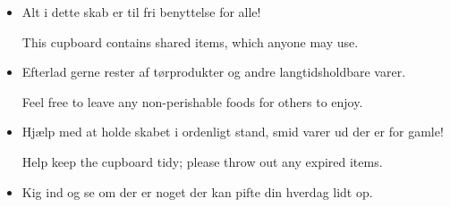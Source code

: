 \documentclass{article}
\begin{document}

\maketitle

\null

\huge

\begin{itemize}

\item Alt i dette skab er til fri benyttelse for alle!

\english This cupboard contains shared items, which anyone may use. 

\vspace{0.3in}

\dansk\item Efterlad gerne rester af tørprodukter og andre langtidsholdbare
varer.

\english Feel free to leave any non-perishable foods for others to enjoy.

\vspace{0.3in}

\dansk \item Hjælp med at holde skabet i ordenligt stand, smid varer ud der er
for gamle!

\english Help keep the cupboard tidy; please throw out any expired items.

\vspace{0.3in}

\dansk\item Kig ind og se om der er noget der kan pifte din hverdag lidt op.

\end{itemize}

\underskriv
\end{document}
